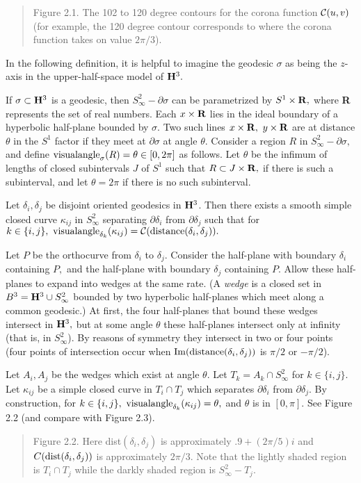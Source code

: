  
\begin{quote} Figure 2.1. The  102 to 120 degree contours for the corona function ${\cal C}(u,v)$ (for example, the 120 degree contour corresponds
to
where the corona function takes on value $2\pi/3$).
\end{quote}

 
In the following definition, it is helpful to imagine the geodesic $\sigma$
as being the $z$-axis in the upper-half-space model of ${\bf H}^3.$

  If $\sigma\subset {\bf H}^3$ is a
geodesic, then $S^2_\infty - \partial\sigma$ can be
parametrized by $S^1\times {\bf R},$  where {\bf R} represents the set of
real numbers.
Each $x\times {\bf R}$ lies in the ideal boundary of
a hyperbolic half-plane bounded by $\sigma.$
Two such lines $x\times {\bf R},\ y\times {\bf R}$
are at distance $\theta$ in the $S^1$ factor if they meet at
$\partial \sigma$ at angle $\theta.$
Consider a region $R$ in $S^2_\infty-\partial \sigma,$ and define
${\rm visualangle}_\sigma(R)=\theta\in [0,2\pi]$ as follows.
Let $\theta$ be the infimum of lengths of closed subintervals $J$ of $S^1$
such that $R \subset J \times {\bf R},$ if there is such a subinterval, and
let $\theta = 2\pi$ if there is no such subinterval.
\enddemo

  Let $\delta_i, \delta_j$ be
disjoint oriented geodesics in ${\bf H}^3$.
Then there exists a smooth simple closed curve $\kappa_{ij}$ in $S^2_{\infty}$
separating $\partial\delta_i$ from $\partial\delta_j$ such that for $k\in
\{i,j\},\
{\rm visualangle}_{\delta_k}(\kappa_{ij})={\cal C}({\rm distance}(\delta_i, \delta_j)).$
\endproclaim

Let $P$ be the orthocurve from  $\delta_i$ to  $\delta_j.$
Consider the half-plane with boundary $\delta_i$ containing $P,$ and the
half-plane with boundary $\delta_j$ containing $P.$   Allow these
half-planes to expand into wedges at the same rate. (A {\it wedge} is a
closed set in $B^3 = {\bf H}^3 \cup S^2_\infty$ bounded by two hyperbolic
half-planes which meet along a common geodesic.)  At first, the four
half-planes that bound these wedges intersect in ${\bf H}^3,$ but at some
angle $\theta$ these half-planes intersect only at infinity (that is, in
$S_\infty^2$). By reasons of symmetry they intersect in two or four points
(four points of intersection occur when ${\rm Im}({\rm distance}(\delta_i,
\delta_j))$ is  $\pi/2$ or $-\pi/2$).

Let $A_i, A_j$ be the wedges which exist at angle $\theta.$ Let
$T_k=A_k\cap S^2_\infty$ for $k\in \{i,j\}.$  Let $\kappa_{ij}$ be a simple
closed curve in
$T_i\cap T_j$ which separates $\partial \delta_i$ from $\partial \delta_j.$  By
construction, for $k\in \{i,j\},\ \va_{\delta_k}(\kappa_{ij})=\theta,$
and $\theta$ is in $[0,\pi].$
See
Figure 2.2 (and compare with Figure 2.3).
\begin{quote} Figure 2.2.  Here dist$(\delta_i,\delta_j)$ is approximately $.9+(2\pi/5) i$ and\break $C({\rm
dist}(\delta_i,\delta_j))$ is approximately $2\pi/3$.  Note that the lightly shaded region is $T_i\cap T_j$ while the darkly
shaded region is
$S^2_\infty - T_j.$
\end{quote}


